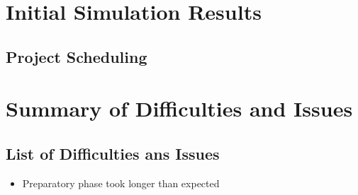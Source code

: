 \documentclass[a4paper,12pt]{report}
\begin{document}
\chapter{Initial Simulation Results}
\section{Project Scheduling}
 

\chapter{Summary of Difficulties and Issues}
\section{List of Difficulties ans Issues}
\begin{itemize}
	\item Preparatory phase took longer than expected  
\end{itemize}
\end{document}

